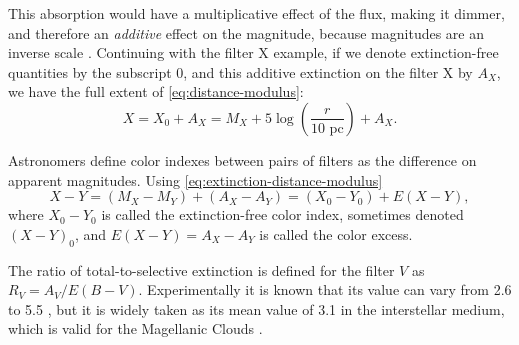 	This absorption would have a multiplicative effect of the flux, making it dimmer, 
	and therefore an \textit{additive} effect on the magnitude, because magnitudes are an inverse scale \citep{Karttunen2017}.
	Continuing with the filter X example, if we denote extinction-free quantities by the subscript 0, 
	and this additive extinction on the filter X by $A_X$, we have the full extent of \autoref{eq:distance-modulus}:
	\begin{equation}
		X = X_0 + A_X = M_X + 5 \log\left(\frac{r}{10 \text{ pc}}\right) + A_X. \label{eq:extinction-distance-modulus}
	\end{equation}
	
	Astronomers define color indexes between pairs of filters as the difference on apparent magnitudes. Using \autoref{eq:extinction-distance-modulus}
	\begin{equation}
		X - Y = (M_X - M_Y) + (A_X - A_Y) = (X_0 - Y_0 )+ E(X-Y), \label{eq:color-index}
	\end{equation}
	where $X_0-Y_0$ is called the extinction-free color index, sometimes denoted $(X-Y)_0$,
	and $E(X-Y) = A_X - A_Y$ is called the color excess. 
	
	The ratio of total-to-selective extinction is defined for the filter $V$ as $R_V = A_V/E(B-V)$. 
	Experimentally it is known that its value can vary from 2.6 to 5.5 \citep{Clayton1988},
	but it is widely taken as its mean value of 3.1 in the interstellar medium, which is valid for the Magellanic Clouds \citep{Cardelli1989,Gorski2020}.
	
